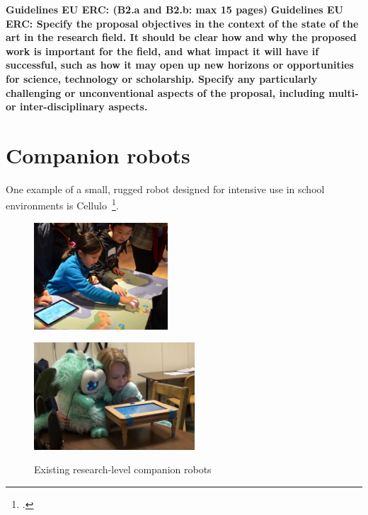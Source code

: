 \documentclass[11pt]{report}
\newcommand{\eu}[1]{{\color{teal}\textbf{Guidelines EU ERC: #1}}}
\begin{document}
\eu{(B2.a and B2.b: max 15 pages)}
\eu{Specify the proposal objectives in the context of the state
of the art in the research field. It should be clear how and why the proposed work is important for
the field, and what impact it will have if successful, such as how it may open up new horizons or
opportunities for science, technology or scholarship. Specify any particularly challenging or
unconventional aspects of the proposal, including multi- or inter-disciplinary aspects.}

\section{Companion robots}

One example of a small, rugged robot designed for intensive use in school
environments is Cellulo~\footcite{ozgur2017cellulo}.

\begin{figure}[!htbp]
    \begin{minipage}[b]{.3\linewidth}
        \centering\includegraphics[height=4cm]{figs/cellulo.jpg}
        \label{fig:cellulo}
    \end{minipage}%
    \hspace{0.5cm}
    \begin{minipage}[b]{.3\linewidth}
        \centering
        \includegraphics[height=4cm]{figs/tega.jpg}
        \label{fig:tega}
    \end{minipage}
    \hspace{0.5cm}
    \begin{minipage}[b]{.3\linewidth}
        \centering
        \label{fig:ono}
    \end{minipage}
    \caption{Existing research-level companion robots}\label{fig:research-robots}
\end{figure}
\end{document}
